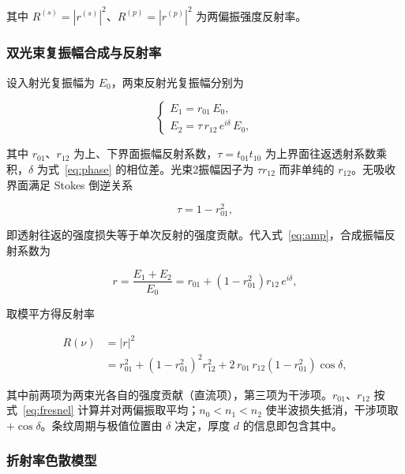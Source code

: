 \documentclass[withoutpreface,bwprint]{cumcmthesis}
\begin{document}
其中 $R^{(s)}=|r^{(s)}|^2$、$R^{(p)}=|r^{(p)}|^2$ 为两偏振强度反射率。

\subsubsection{双光束复振幅合成与反射率}

设入射光复振幅为 $E_0$，两束反射光复振幅分别为

\begin{equation}
\begin{cases}
E_1 = r_{01}\,E_0,\\[4pt]
E_2 = \tau\, r_{12}\, e^{i\delta}\, E_0,
\end{cases}
\label{eq:amp}
\end{equation}

其中 $r_{01}$、$r_{12}$ 为上、下界面振幅反射系数，$\tau=t_{01}t_{10}$ 为上界面往返透射系数乘积，$\delta$ 为式~\eqref{eq:phase} 的相位差。光束2振幅因子为 $\tau r_{12}$ 而非单纯的 $r_{12}$。无吸收界面满足 Stokes 倒逆关系

\begin{equation}
\tau = 1 - r_{01}^{2},
\label{eq:stokes}
\end{equation}

即透射往返的强度损失等于单次反射的强度贡献。代入式~\eqref{eq:amp}，合成振幅反射系数为

\begin{equation}
r = \frac{E_1 + E_2}{E_0}
  = r_{01} + \left(1 - r_{01}^{2}\right) r_{12}\,e^{i\delta},
\label{eq:composite}
\end{equation}

取模平方得反射率

\begin{equation}
\begin{aligned}
R(\nu) &= |r|^2 \\
       &= r_{01}^{2} + \left(1-r_{01}^{2}\right)^{2} r_{12}^{2}
          + 2\,r_{01}\,r_{12}\left(1-r_{01}^{2}\right)\cos\delta,
\end{aligned}
\label{eq:reflectance}
\end{equation}

其中前两项为两束光各自的强度贡献（直流项），第三项为干涉项。$r_{01}$、$r_{12}$ 按式~\eqref{eq:fresnel} 计算并对两偏振取平均；$n_0<n_1<n_2$ 使半波损失抵消，干涉项取 $+\cos\delta$。条纹周期与极值位置由 $\delta$ 决定，厚度 $d$ 的信息即包含其中。

\subsubsection{折射率色散模型}
\end{document}
